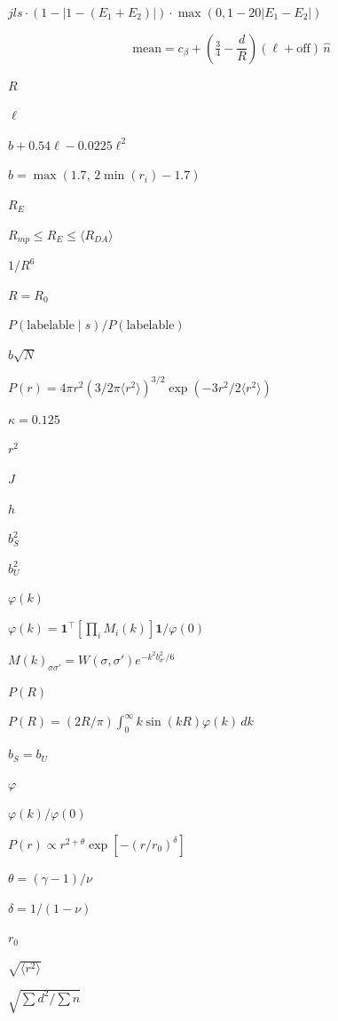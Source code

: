 \documentclass{article}
\begin{document}
$jls \cdot (1 - |1 - (E_1 + E_2)|) \cdot \max(0, 1 - 20|E_1 - E_2|)$
\pagebreak

\[    \mathrm{mean} = c_\beta + \left(\tfrac{3}{4} - \frac{d}{R}\right)
                    (\ell + \mathrm{off})\,\hat{n}
\]
\pagebreak

$R$
\pagebreak

$\ell$
\pagebreak

$b + 0.54\ell - 0.0225\ell^2$
\pagebreak

$b = \max(1.7,\, 2\min(r_i) - 1.7)$
\pagebreak

$R_E$
\pagebreak

$R_{mp} \le R_E \le \langle R_{DA}\rangle$
\pagebreak

$1/R^6$
\pagebreak

$R = R_0$
\pagebreak

$P(\mathrm{labelable} \mid s) / P(\mathrm{labelable})$
\pagebreak

$b\sqrt{N}$
\pagebreak

$P(r) = 4\pi r^2 (3/2\pi\langle r^2\rangle)^{3/2}\exp(-3r^2/2\langle r^2\rangle)$
\pagebreak

$\kappa = 0.125$
\pagebreak

$r^2$
\pagebreak

$J$
\pagebreak

$h$
\pagebreak

$b_S^2$
\pagebreak

$b_U^2$
\pagebreak

$\varphi(k)$
\pagebreak

$\varphi(k) = \mathbf{1}^\top[\prod_i M_i(k)]\mathbf{1} / \varphi(0)$
\pagebreak

$M(k)_{\sigma\sigma'} = W(\sigma,\sigma')e^{-k^2b_{\sigma'}^2/6}$
\pagebreak

$P(R)$
\pagebreak

$P(R) = (2R/\pi)\int_0^\infty k\sin(kR)\varphi(k)\,dk$
\pagebreak

$b_S = b_U$
\pagebreak

$\varphi$
\pagebreak

$\varphi(k)/\varphi(0)$
\pagebreak

$P(r) \propto r^{2+\theta}\exp[-(r/r_0)^{\delta}]$
\pagebreak

$\theta = (\gamma-1)/\nu$
\pagebreak

$\delta = 1/(1-\nu)$
\pagebreak

$r_0$
\pagebreak

$\sqrt{\langle r^2\rangle}$
\pagebreak

$\sqrt{\sum d^2 / \sum n}$
\pagebreak
\end{document}
